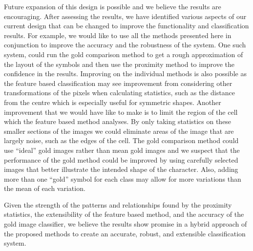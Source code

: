 
Future expansion of this design is possible and we believe the results are
encouraging.  After assessing the results, we have identified various aspects
of our current design that can be changed to improve the functionality and
classification results. For example, we would like to use all the methods
presented here in conjunction to improve the accuracy and the robustness of the
system.  One such system, could run the gold comparison method to get a rough
approximation of the layout of the symbols and then use the proximity method to
improve the confidence in the results. Improving on the individual methods is
also possible as the feature based classification may see improvement from
considering other transformations of the pixels when calculating statistics,
such as the distance from the centre which is especially useful for symmetric
shapes. Another improvement that we would have like to make is to limit the
region of the cell which the feature based method analyses.  By only taking
statistics on these smaller sections of the images we could eliminate areas of
the image that are largely noise, such as the edges of the cell. The gold
comparison method could use ``ideal'' gold images rather than mean gold images
and we suspect that the performance of the gold method could be improved by
using carefully selected images that better illustrate the intended shape of
the character. Also, adding more than one ``gold'' symbol for each class may
allow for more variations than the mean of each variation.

Given the strength of the patterns and relationships found by the proximity
statistics, the extensibility of the feature based method, and the accuracy of
the gold image classifier, we believe the results show promise in a hybrid
approach of the proposed methods to create an accurate, robust, and extensible
classification system.


